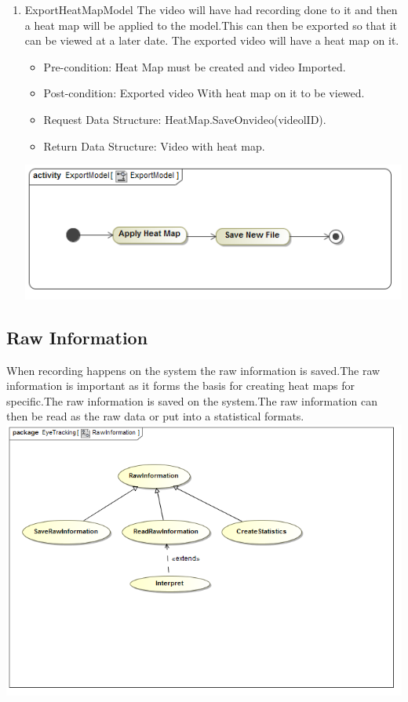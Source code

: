 \begin{enumerate}
			\item{ExportHeatMapModel}
The video will have had recording done to it and then a heat map will be applied to the model.This can then be exported so that it can be viewed at a later date. The exported video will have a heat map on it.
			\begin{itemize}
				\item Pre-condition: Heat Map must be created and video Imported.
				\item Post-condition: Exported video With heat map on it to be viewed.
				\item Request Data Structure: HeatMap.SaveOnvideo(videolID).
				\item Return Data Structure: Video with heat map.
			\end{itemize}

\includegraphics[scale=0.5]{Diagrams/Activity_Diagram__ExportModel__ExportModel.png}

		\end{enumerate}
		
\subsection{Raw Information}
When recording happens on the system the raw information is saved.The raw information is important as it forms the basis for creating heat maps for specific.The raw information is saved on the system.The raw information can then be read as the raw data or put into a statistical formats.
\newline
	\includegraphics[scale=0.5]{Diagrams/Use_Case_Diagram__RawInformation.png}

